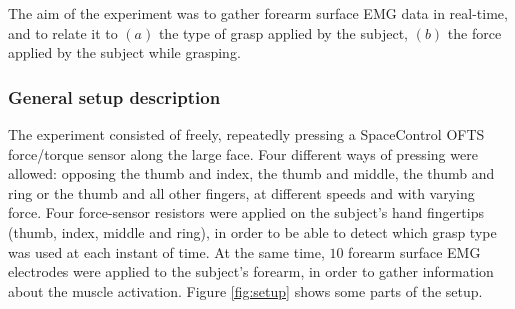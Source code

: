 The aim of the experiment was to gather forearm surface EMG data in
real-time, and to relate it to $(a)$ the type of grasp applied by the
subject, $(b)$ the force applied by the subject while grasping.

\subsubsection{General setup description}

The experiment consisted of freely, repeatedly pressing a SpaceControl
OFTS force/torque sensor \cite{...} along the large face. Four
different ways of pressing were allowed: opposing the thumb and index,
the thumb and middle, the thumb and ring or the thumb and all other
fingers, at different speeds and with varying force. Four force-sensor
resistors were applied on the subject's hand fingertips (thumb, index,
middle and ring), in order to be able to detect which grasp type was
used at each instant of time. At the same time, $10$ forearm surface
EMG electrodes were applied to the subject's forearm, in order to
gather information about the muscle activation. Figure \ref{fig:setup}
shows some parts of the setup.


